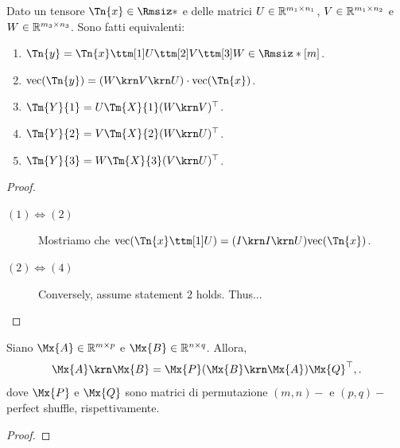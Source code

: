 \begin{proposition}
  Dato un tensore $ \Tn{x} \in \Rmsiz* $ e delle matrici $ U \in \mathbb{R}^{m_1 \times n_1} $, $ V \in
  \mathbb{R}^{m_1 \times n_2} $ e $ W \in \mathbb{R}^{m_3 \times n_3} $. Sono fatti equivalenti:
  \begin{enumerate}[label=(\roman*)]
    \item $\Tn{y} = \Tn{x} \ttm[1] U \ttm[2] V \ttm[3] W \in \Rmsiz*[m]$.
    \item $\vec(\Tn{y}) = (W \krn V \krn U) \cdot \vec(\Tn{x})$.
    \item $\Tm{Y}{1} = U\Tm{X}{1}(W \krn V)^{\top}$.
    \item $ \Tm{Y}{2} = V\Tm{X}{2}(W \krn U)^{\top} $.
    \item $\Tm{Y}{3} = W\Tm{X}{3}(V \krn U)^{\top}$.
  \end{enumerate}
\end{proposition}
\begin{proof}
\begin{description}
        \item[$(1) \iff (2)$] Mostriamo che $\vec(\Tn{x} \ttm[1] U) = (I \krn I \krn U)
          \vec(\Tn{x})$.
        \item[$(2) \iff (4)$] Conversely, assume statement 2 holds. Thus...
    \end{description}
\end{proof}

\begin{proposition}
  Siano $ \Mx{A} \in \R^{m \times p} $ e $ \Mx{B} \in \R^{n \times q} $. Allora, 
  \[
  \Mx{A} \krn \Mx{B} = \Mx{P}(\Mx{B} \krn \Mx{A})\Mx{Q}^{\top},
  .\] 
  dove $ \Mx{P} $ e $ \Mx{Q} $ sono matrici di permutazione $ (m,n)- $ e $ (p,q)- $ perfect shuffle, rispettivamente.
\end{proposition}
\begin{proof}

\end{proof}

